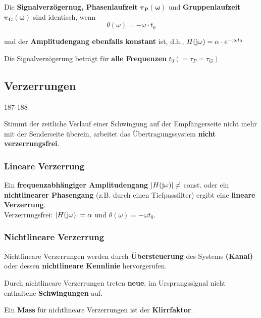 Die \textbf{Signalverzögernug, Phasenlaufzeit} $\bm{\tau_P(\omega)}$ und \textbf{Gruppenlaufzeit} $ \bm{\tau_G(\omega)}$ sind identisch, 
wenn
$$ \boxed{ \theta(\omega) = - \omega \cdot t_0  } $$

und der \textbf{Amplitudengang ebenfalls konstant} ist, d.h., $H(\mathrm{j} \omega) = \alpha \cdot e^{-\mathrm{j} \omega t_0}$ 

\vspace{0.2cm}

Die Signalverzögerung beträgt für \textbf{alle Frequenzen} $t_0 (= \tau_P = \tau_G) $ 




\subsection{Verzerrungen}{187-188}

Stimmt der zeitliche Verlauf einer Schwingung auf der Empfängerseite nicht mehr mit der Senderseite überein, arbeitet das 
Übertragungssystem \textbf{nicht verzerrungsfrei}.


\subsubsection{Lineare Verzerrung}

Ein \textbf{frequenzabhängiger Amplitudengang} $|H(\mathrm{j} \omega)| \neq$ const. oder ein \textbf{nichtlinearer Phasengang} (z.B. durch einen Tiefpassfilter) ergibt eine \textbf{lineare Verzerrung}. \\
Verzerrungsfrei: $|H(\mathrm{j} \omega)| = \alpha$ und $\theta(\omega) = -\omega t_0$.


\subsubsection{Nichtlineare Verzerrung}

Nichtlineare Verzerrungen werden durch \textbf{Übersteuerung} des Systems \textbf{(Kanal)} oder dessen \textbf{nichtlineare Kennlinie} 
hervorgerufen.

\vspace{0.1cm}

Durch nichtlineare Verzerrungen treten \textbf{neue}, im Ursprungssignal nicht enthaltene \textbf{Schwingungen} auf.

\vspace{0.1cm}

Ein \textbf{Mass} für nichtlineare Verzerrungen ist der \textbf{Klirrfaktor}.


